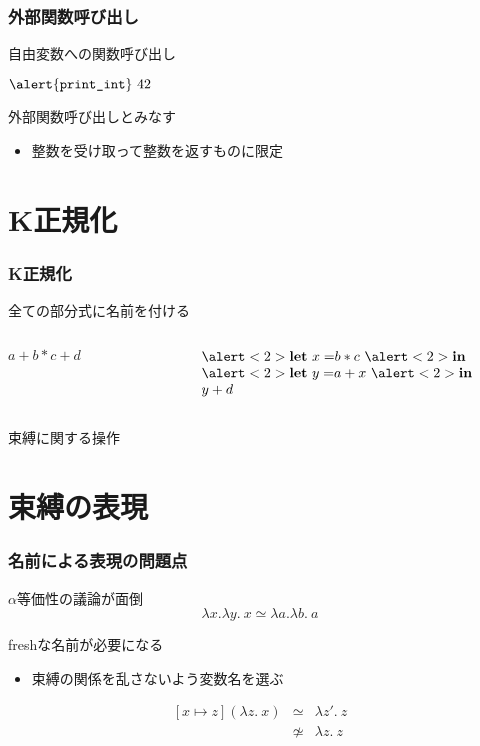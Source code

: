 \documentclass[dvipdfmx,cjk,xcolor=dvipsnames,envcountsect,notheorems,12pt]{beamer}
\theoremstyle{definition}
\newcommand{\keyword}[1]{\mathbf{#1}}
\newcommand{\LET}{\keyword{let}}
\newcommand{\IN}{\keyword{in}}
\begin{document}
\begin{frame}
	\frametitle{外部関数呼び出し}
	\LARGE \alert{自由変数}への関数呼び出し

	\vfill

	\begin{center}
		\Large
		$ \alert{\texttt{print\_int}}~42 $
	\end{center}

	\vfill

	外部関数呼び出しとみなす
	\begin{itemize}
		\item 整数を受け取って整数を返すものに限定
	\end{itemize}
\end{frame}

\section{K正規化}

\begin{frame}
	\frametitle{K正規化}
	\LARGE
	全ての部分式に名前を付ける

	\begin{columns}
		\begin{column}{0.5\textwidth}
			\begin{center}
				$a+b*c+d$
			\end{center}
		\end{column}
		\begin{column}{0.5\textwidth}
			\begin{center}
				\[
					\begin{array}{l}
						\alert<2>{\LET~x =} b * c~\alert<2>{\IN} \\
						\alert<2>{\LET~y =} a + x~\alert<2>{\IN} \\
						y + d
					\end{array}
				\]
			\end{center}
		\end{column}
	\end{columns}

	\vfill

	\alert<2>{束縛に関する操作}
	\pause
\end{frame}

\section{束縛の表現}

\begin{frame}
	\frametitle{名前による表現の問題点}
	\LARGE $\alpha$等価性の議論が面倒
	\[ \lambda x.\lambda y.~x \simeq \lambda a.\lambda b.~a \]

	\vfill

	freshな名前が必要になる
	\begin{itemize}
		\item 束縛の関係を乱さないよう変数名を選ぶ
	\end{itemize}
	\[
		\begin{array}{lcl}
			[x \mapsto z](\lambda z.~x) & \simeq & \lambda z'.~z \\
																	& \not \simeq & \lambda z.~z
		\end{array}
	\]
\end{frame}
\end{document}
